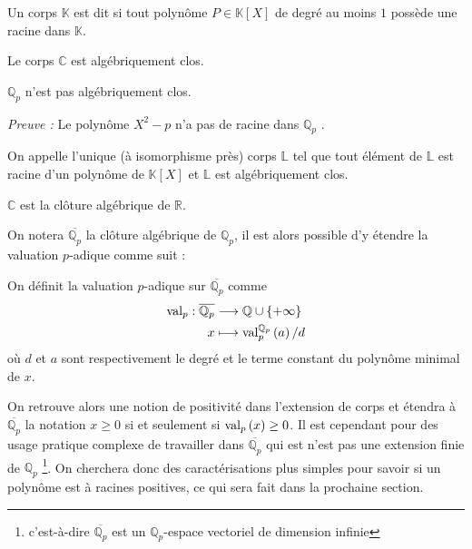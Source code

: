 \begin{definition}
	Un corps $\mathbb{K}$ est dit  si tout polynôme $P\in \mathbb{K}[X]$ de degré au moins $1$ possède une racine dans $\mathbb{K}$.
\end{definition}
\begin{ex}
	Le corps $\mathbb{C}$ est algébriquement clos.
\end{ex}
\begin{proposition}
	$\mathbb{Q}_{p} $ n'est pas algébriquement clos.
\end{proposition}
\textit{Preuve :} Le polynôme $X^2 - p$ n'a pas de racine dans $\mathbb{Q}_{p}$ \hfill \qedsymbol.

\begin{definition}
	On appelle  l'unique (à isomorphisme près) corps $\mathbb{L}$ tel que tout élément de $\mathbb{L}$ est racine d'un polynôme de $\mathbb{K}[X]$ et $\mathbb{L}$ est algébriquement clos.
\end{definition}
\begin{ex}
	$\mathbb{C}$ est la clôture algébrique de $\mathbb{R}$.
\end{ex}
On notera $\overline{\mathbb{Q}_{p} }$ la clôture algébrique de $\mathbb{Q}_{p}$, il est alors possible d'y étendre la valuation $p$-adique comme suit :

\begin{definition}
	On définit la valuation $p$-adique sur $\overline{\mathbb{Q}_{p} }$ comme 
\begin{align*}
	\text{val}_p : \overline{\mathbb{Q}_{p}} & \longrightarrow \mathbb{Q}\cup \{+\infty\} \\
x & \longmapsto \text{val}_p^{\mathbb{Q}_{p} } \left(a\right)/d
\end{align*}
	où $d$ et $a$ sont respectivement le degré et le terme constant du polynôme minimal de $x$.
\end{definition}

On retrouve alors une notion de positivité dans l'extension de corps et étendra à $\overline{\mathbb{Q}_{p}} $ la notation $x\ge 0$ si et seulement si $\text{val}_p\left(x\right)\ge 0$. Il est cependant pour des usage pratique complexe de travailler dans $\overline{\mathbb{Q}_{p} }$ qui est n'est pas une extension finie de $\mathbb{Q}_{p} $ \footnote{c'est-à-dire $\overline{\mathbb{Q}_{p} }$ est un $\mathbb{Q}_{p}$-espace vectoriel de dimension infinie }. On cherchera donc des caractérisations plus simples pour savoir si un polynôme est à racines positives, ce qui sera fait dans la prochaine section.

